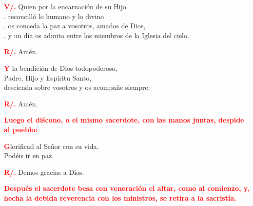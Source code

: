 \documentclass[12pt, letterpaper]{report}
\begin{document}
\Large \hspace{-0.9cm} {\bfseries \textcolor{red}{V/.}} \hspace{0.5cm} Quien por la encarnaci\'on de su Hijo \\
. \hspace{1cm} reconcill\'o lo humano y lo divino \\
. \hspace{1cm} os conceda la paz a vosotros, amados de Dios, \\
. \hspace{1cm} y un d\'ia os admita entre los miembros de la Iglesia del cielo. \newline

\Large \hspace{-0.9cm} {\bfseries \textcolor{red}{R/.}} \hspace{0.5cm} Am\'en. \newline


\lettrine[lines=1]{\bfseries \textcolor{red}{Y}}{} \Large la bendici\'on de Dios todopoderoso, \\
Padre, Hijo \Huge{\textcolor{red}{}} \Large y Esp\'iritu Santo, \\
descienda sobre vosotros y os acompa\~ne siempre. \newline

\Large \hspace{-0.9cm} {\bfseries \textcolor{red}{R/.}} \hspace{0.5cm} Am\'en.\newline

\large{\bfseries \textcolor{red}{Luego el di\'scono, o el mismo sacerdote, con las manos juntas, despide al pueblo:}}\newline

\lettrine[lines=1]{\bfseries \textcolor{red}{G}}{}\Large lorificad al Se\~nor con su vida. \\
Pod\'eis ir en paz. \newline

\Large \hspace{-0.9cm} {\bfseries \textcolor{red}{R/.}} \hspace{0.5cm} Demos gracias a Dios. \newline

\large{\bfseries \textcolor{red}{Despu\'es el sacerdote besa con veneraci\'on el altar, como al comienzo, y, hecha la debida reverencia con los ministros, se retira a la sacrist\'ia.}}\newline

\end{document}
